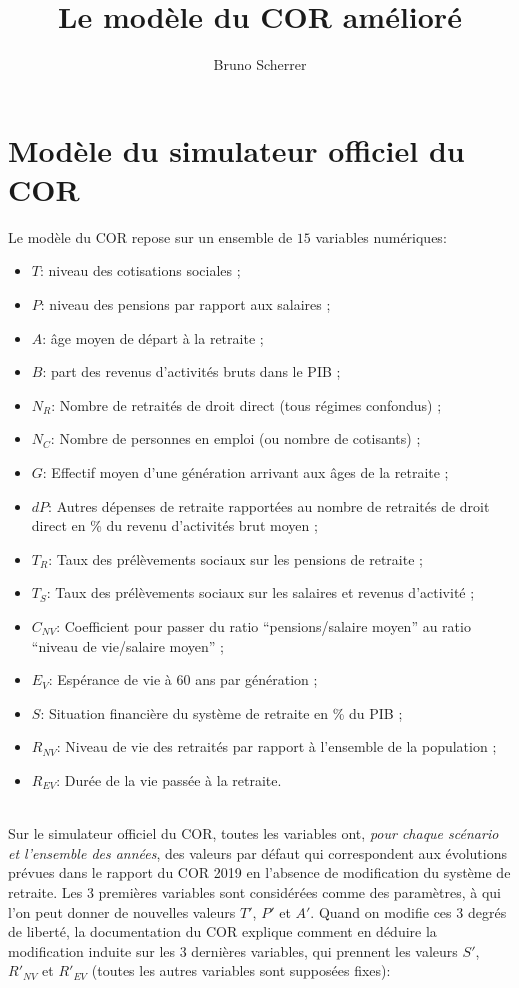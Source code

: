 \documentclass[10pt]{article}
\title{Le modèle du COR amélioré}
\author{Bruno Scherrer}
\begin{document}
\maketitle

\section{Modèle du simulateur officiel du COR}

  Le modèle du COR repose sur un ensemble de $15$ variables numériques:
  \begin{itemize}
  \item $T$: niveau des cotisations sociales ;
  \item $P$: niveau des pensions par rapport aux salaires ;
  \item $A$: âge moyen de départ à la retraite ;
  \item $B$: part des revenus d'activités bruts dans le PIB ;
  \item $N_R$: Nombre de retraités de droit direct (tous régimes confondus) ;
  \item $N_C$: Nombre de personnes en emploi (ou nombre de cotisants) ;
  \item $G$: Effectif moyen d'une génération arrivant aux âges de la retraite ;
  \item $dP$: Autres dépenses de retraite rapportées au nombre de retraités de droit direct en \% du revenu d'activités brut moyen ;
  \item $T_R$: Taux des prélèvements sociaux sur les pensions de retraite ;
  \item $T_S$: Taux des prélèvements sociaux sur les salaires et revenus d'activité ;
  \item $C_{NV}$: Coefficient pour passer du ratio ``pensions/salaire moyen'' au ratio ``niveau de vie/salaire moyen'' ;
  \item $E_V$: Espérance de vie à 60 ans par génération ;
  \item $S$: Situation financière du système de retraite en \% du PIB ;
  \item $R_{NV}$: Niveau de vie des retraités par rapport à l'ensemble de la population ;
    \item $R_{EV}$: Durée de la vie passée à la retraite.
  \end{itemize}

~\\
  
  Sur le simulateur officiel du COR, toutes les variables ont, \emph{pour chaque scénario et l'ensemble des années}, des valeurs par défaut qui correspondent aux évolutions prévues dans le rapport du COR 2019 en l'absence de modification du système de retraite. Les 3 premières variables sont considérées comme des paramètres, à qui l'on peut donner de nouvelles valeurs $T'$, $P'$ et $A'$. Quand on modifie ces 3 degrés de liberté, la documentation du COR explique comment en déduire la modification induite sur les 3 dernières variables, qui prennent les valeurs $S'$, $R'_{NV}$ et $R'_{EV}$ (toutes les autres variables sont supposées fixes):
\end{document}
